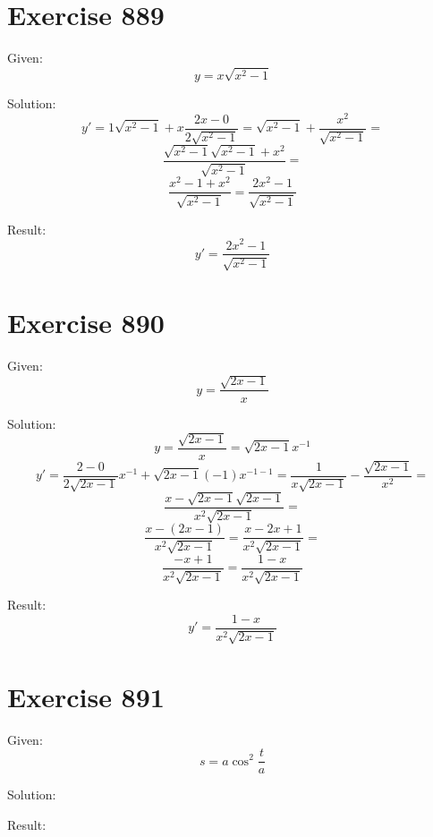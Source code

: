 \documentclass[a4paper, 10pt]{scrartcl}
\begin{document}
\section{Exercise 889}

Given:
\[
y = x\sqrt{x^{2} - 1}
\]

Solution:
\[
y' = 1\sqrt{x^{2} - 1} + x\frac{2x - 0}{2\sqrt{x^{2} - 1}} = \sqrt{x^{2} - 1} + \frac{x^{2}}{\sqrt{x^{2} - 1}} =
\]
\[
\frac{\sqrt{x^{2} - 1}\sqrt{x^{2} - 1} + x^{2}}{\sqrt{x^{2} - 1}} =
\]
\[
\frac{x^{2} - 1 + x^{2}}{\sqrt{x^{2} - 1}} = \frac{2x^{2} - 1}{\sqrt{x^{2} - 1}}
\]

Result:
\[
y' = \frac{2x^{2} - 1}{\sqrt{x^{2} - 1}}
\]

\section{Exercise 890}

Given:
\[
y = \frac{\sqrt{2x - 1}}{x}
\]

Solution:
\[
y = \frac{\sqrt{2x - 1}}{x} = \sqrt{2x - 1}x^{-1}
\]
\[
y' = \frac{2 - 0}{2\sqrt{2x - 1}}x^{-1} + \sqrt{2x - 1}(-1)x^{-1 - 1} = \frac{1}{x\sqrt{2x - 1}} - \frac{\sqrt{2x - 1}}{x^{2}} =
\]
\[
\frac{x - \sqrt{2x - 1}\sqrt{2x - 1}}{x^{2}\sqrt{2x - 1}} =
\]
\[
\frac{x - (2x - 1)}{x^{2}\sqrt{2x - 1}} = \frac{x - 2x + 1}{x^{2}\sqrt{2x - 1}} =
\]
\[
\frac{-x + 1}{x^{2}\sqrt{2x - 1}} = \frac{1 - x}{x^{2}\sqrt{2x - 1}}
\]

Result:
\[
y' = \frac{1 - x}{x^{2}\sqrt{2x - 1}}
\]

\section{Exercise 891}

Given:
\[
s = a\cos^{2}{\frac{t}{a}}
\]

Solution:

Result:
\end{document}
